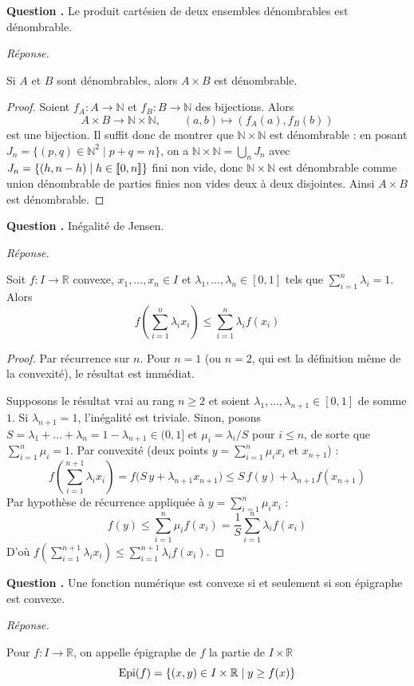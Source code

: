 \documentclass[11pt]{article}
\newcounter{qnum}
\newcommand{\question}[1]{%
\stepcounter{qnum}%
\bigskip
\noindent\textbf{Question \theqnum.} #1\par}
\newcommand{\reponse}{\noindent\textit{Réponse.}\ }
\begin{document}
\question{Le produit cartésien de deux ensembles dénombrables est dénombrable.}
\reponse
\begin{prop}
Si $A$ et $B$ sont dénombrables, alors $A\times B$ est dénombrable.
\end{prop}

\begin{proof}
Soient $f_A:A\to\mathbb{N}$ et $f_B:B\to\mathbb{N}$ des bijections. Alors
\[A\times B \to \mathbb{N}\times\mathbb{N}, \qquad (a,b)\mapsto (f_A(a),f_B(b))\]
est une bijection. Il suffit donc de montrer que $\mathbb{N}\times\mathbb{N}$ est dénombrable : en posant $J_n=\{(p,q)\in\mathbb{N}^2\mid p+q=n\}$, on a $\mathbb{N}\times\mathbb{N}=\bigcup_{n} J_n$ avec $J_n=\{(h,n-h)\mid h\in\llbracket 0,n \rrbracket\}$ fini non vide, donc $\mathbb{N}\times\mathbb{N}$ est dénombrable comme union dénombrable de parties finies non vides deux à deux disjointes. Ainsi $A\times B$ est dénombrable.
\end{proof}

\question{Inégalité de Jensen.}
\reponse
\begin{prop}
Soit $f:I\to\mathbb{R}$ convexe, $x_1,\dots,x_n\in I$ et $\lambda_1,\dots,\lambda_n\in[0,1]$ tels que $\displaystyle\sum_{i=1}^n \lambda_i=1$. Alors
\[f\left(\sum_{i=1}^n \lambda_i x_i\right) \leq \sum_{i=1}^n \lambda_i f(x_i)\]
\end{prop}

\begin{proof}
Par récurrence sur $n$. Pour $n=1$ (ou $n=2$, qui est la définition même de la convexité), le résultat est immédiat.

Supposons le résultat vrai au rang $n\geq 2$ et soient $\lambda_1,\dots,\lambda_{n+1}\in[0,1]$ de somme $1$. Si $\lambda_{n+1}=1$, l'inégalité est triviale. Sinon, posons $S=\lambda_1+\dots+\lambda_n=1-\lambda_{n+1}\in(0,1]$ et $\mu_i=\lambda_i/S$ pour $i\leq n$, de sorte que $\sum_{i=1}^n \mu_i=1$. Par convexité (deux points $y=\sum_{i=1}^n \mu_i x_i$ et $x_{n+1}$) :
\[f\left(\sum_{i=1}^{n+1}\lambda_i x_i\right) = f\big(S\, y + \lambda_{n+1}x_{n+1}\big) \leq S\, f(y) + \lambda_{n+1} f(x_{n+1})\]
Par hypothèse de récurrence appliquée à $y=\sum_{i=1}^n \mu_i x_i$ :
\[f(y) \leq \sum_{i=1}^n \mu_i f(x_i) = \frac{1}{S}\sum_{i=1}^n \lambda_i f(x_i)\]
D'où $\displaystyle f\left(\sum_{i=1}^{n+1}\lambda_i x_i\right) \leq \sum_{i=1}^{n+1}\lambda_i f(x_i)$.
\end{proof}

\question{Une fonction numérique est convexe si et seulement si son épigraphe est convexe.}
\reponse
\begin{defi}[Épigraphe]
Pour $f:I\to\mathbb{R}$, on appelle épigraphe de $f$ la partie de $I\times\mathbb{R}$
\[\operatorname{Epi}(f) = \{(x,y)\in I\times\mathbb{R} \mid y\geq f(x)\}\]
\end{defi}
\end{document}
